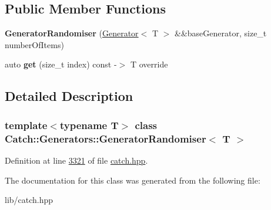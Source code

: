 \subsection*{Public Member Functions}
\begin{DoxyCompactItemize}
\item 
\mbox{\label{classCatch_1_1Generators_1_1GeneratorRandomiser_aba3234a2885baff107766814d10c2efc}} 
{\bfseries Generator\+Randomiser} (\mbox{\hyperlink{classCatch_1_1Generators_1_1Generator}{Generator}}$<$ T $>$ \&\&base\+Generator, size\+\_\+t number\+Of\+Items)
\item 
\mbox{\label{classCatch_1_1Generators_1_1GeneratorRandomiser_a4ad5de15865727bdaa638863e0969ab4}} 
auto {\bfseries get} (size\+\_\+t index) const -\/$>$ T override
\end{DoxyCompactItemize}


\subsection{Detailed Description}
\subsubsection*{template$<$typename T$>$\newline
class Catch\+::\+Generators\+::\+Generator\+Randomiser$<$ T $>$}



Definition at line \mbox{\hyperlink{catch_8hpp_source_l03321}{3321}} of file \mbox{\hyperlink{catch_8hpp_source}{catch.\+hpp}}.



The documentation for this class was generated from the following file\+:\begin{DoxyCompactItemize}
\item 
lib/catch.\+hpp\end{DoxyCompactItemize}
